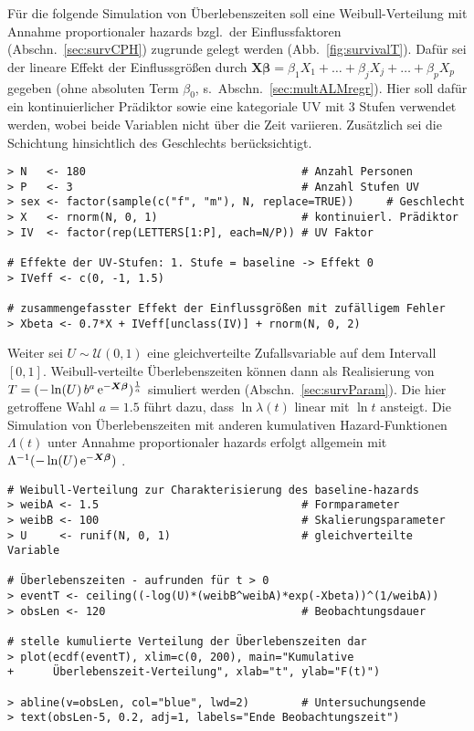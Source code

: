 Für die folgende Simulation von Überlebenszeiten soll eine Weibull-Verteilung mit Annahme proportionaler hazards bzgl.\ der Einflussfaktoren (Abschn.\ \ref{sec:survCPH}) zugrunde gelegt werden (Abb.\ \ref{fig:survivalT}). Dafür sei der lineare Effekt der Einflussgrößen durch $\bm{X} \bm{\beta} = \beta_{1} X_{1} + \dots + \beta_{j} X_{j} + \dots + \beta_{p} X_{p}$ gegeben (ohne absoluten Term $\beta_{0}$, s.\ Abschn.\ \ref{sec:multALMregr}). Hier soll dafür ein kontinuierlicher Prädiktor sowie eine kategoriale UV mit $3$ Stufen verwendet werden, wobei beide Variablen nicht über die Zeit variieren. Zusätzlich sei die Schichtung hinsichtlich des Geschlechts berücksichtigt.
\begin{lstlisting}
> N   <- 180                                 # Anzahl Personen
> P   <- 3                                   # Anzahl Stufen UV
> sex <- factor(sample(c("f", "m"), N, replace=TRUE))     # Geschlecht
> X   <- rnorm(N, 0, 1)                      # kontinuierl. Prädiktor
> IV  <- factor(rep(LETTERS[1:P], each=N/P)) # UV Faktor

# Effekte der UV-Stufen: 1. Stufe = baseline -> Effekt 0
> IVeff <- c(0, -1, 1.5)

# zusammengefasster Effekt der Einflussgrößen mit zufälligem Fehler
> Xbeta <- 0.7*X + IVeff[unclass(IV)] + rnorm(N, 0, 2)
\end{lstlisting}

Weiter sei $U \sim \mathcal{U}(0, 1)$ eine gleichverteilte Zufallsvariable auf dem Intervall $[0, 1]$. Weibull-verteilte Überlebenszeiten können dann als Realisierung von $T = (-\ln(U) \, b^{a} \, {\mathrm{e}}^{-\bm{X} \bm{\beta}})^{\frac{1}{a}}$ simuliert werden (Abschn.\ \ref{sec:survParam}). Die hier getroffene Wahl $a = 1.5$ führt dazu, dass $\ln \lambda(t)$ linear mit $\ln t$ ansteigt. Die Simulation von Überlebenszeiten mit anderen kumulativen Hazard-Funktionen $\Lambda(t)$ unter Annahme proportionaler hazards erfolgt allgemein mit $\Lambda^{-1}(-\ln(U) \, {\mathrm{e}}^{-\bm{X} \bm{\beta}})$ \cite{Bender2005}.
\begin{lstlisting}
# Weibull-Verteilung zur Charakterisierung des baseline-hazards
> weibA <- 1.5                               # Formparameter
> weibB <- 100                               # Skalierungsparameter
> U     <- runif(N, 0, 1)                    # gleichverteilte Variable

# Überlebenszeiten - aufrunden für t > 0
> eventT <- ceiling((-log(U)*(weibB^weibA)*exp(-Xbeta))^(1/weibA))
> obsLen <- 120                              # Beobachtungsdauer

# stelle kumulierte Verteilung der Überlebenszeiten dar
> plot(ecdf(eventT), xlim=c(0, 200), main="Kumulative
+      Überlebenszeit-Verteilung", xlab="t", ylab="F(t)")

> abline(v=obsLen, col="blue", lwd=2)        # Untersuchungsende
> text(obsLen-5, 0.2, adj=1, labels="Ende Beobachtungszeit")
\end{lstlisting}

